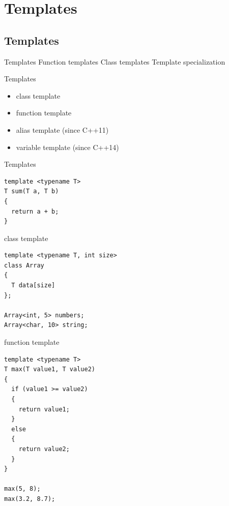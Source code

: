 \documentclass{beamer}
\begin{document}
\section{Templates}
\subsection{Templates}

\begin{frame}{Templates}
Function templates
Class templates
Template specialization
\end{frame}

\begin{frame}{Templates}
\begin{itemize}
  \item class template
  \item function template
  \item alias template (since C++11)
  \item variable template (since C++14)
\end{itemize}
\end{frame}

\begin{frame}[fragile]{Templates}
\begin{lstlisting}[caption=Templates]
template <typename T>
T sum(T a, T b)
{
  return a + b;
}\end{lstlisting}
\end{frame}

\begin{frame}[fragile]{class template}
\begin{lstlisting}
template <typename T, int size>
class Array
{
  T data[size]
};

Array<int, 5> numbers;
Array<char, 10> string;
\end{lstlisting}
\end{frame}

\begin{frame}[fragile]{function template}
\begin{lstlisting}
template <typename T>
T max(T value1, T value2)
{
  if (value1 >= value2)
  {
    return value1;
  }
  else
  {
    return value2;
  }
}

max(5, 8);
max(3.2, 8.7);
\end{lstlisting}
\end{frame}
\end{document}
